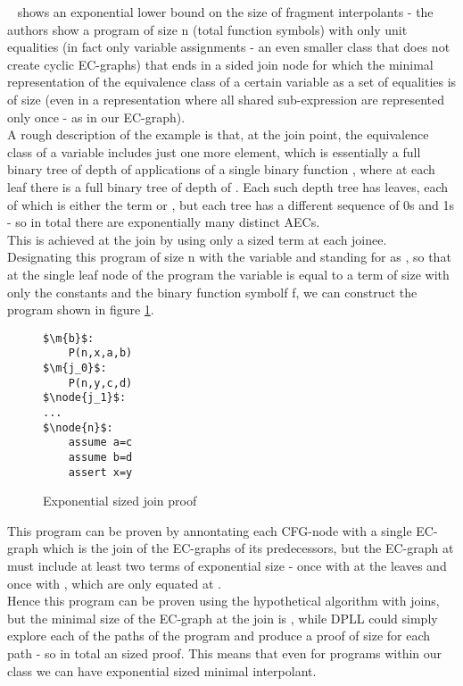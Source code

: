 ~\cite{GulwaniNecula07} shows an exponential lower bound on the size of fragment interpolants - the authors show a program of size n (total function symbols) with only unit equalities (in fact only variable assignments - an even smaller class that does not create cyclic EC-graphs) that ends in a  sided join node for which the minimal representation of the equivalence class of a certain variable as a set of equalities is of size  (even in a representation where all shared sub-expression are represented only once - as in our EC-graph).\\
A rough description of the example is that, at the join point, the equivalence class of a variable includes just one more element,
which is essentially a full binary tree of depth  of applications of a single binary function , 
where at each leaf there is a full binary tree of depth  of . Each such  depth tree has  leaves, each of which is either the term  or , but each tree has a different sequence of  0s and 1s - so in total there are exponentially many distinct AECs.\\
This is achieved at the join by using only a  sized term at each joinee.\\
Designating this program of size n with the variable  and  standing for  as , 
so that at the single leaf node of the program the variable  is equal to a term of size  with only the constants  and the binary function symbolf f, we can construct the program shown in figure \ref{snippet3.6}.
\begin{figure}
\begin{lstlisting}
$\m{b}$:
	P(n,x,a,b)
$\m{j_0}$:
	P(n,y,c,d)
$\node{j_1}$:
...
$\node{n}$:
	assume a=c
	assume b=d
	assert x=y
\end{lstlisting}
\caption{Exponential sized join proof}
\label{snippet3.6}
\end{figure}

This program can be proven by annontating each CFG-node with a single EC-graph which is the join of the EC-graphs of its predecessors, but the EC-graph at  must include at least two terms of exponential size - once with  at the leaves and once with , which are only equated at .\\
Hence this program can be proven using the hypothetical algorithm with joins, but the minimal size of the EC-graph at the join is , while DPLL could simply explore each of the  paths of the program and produce a proof of size  for each path - so in total an  sized proof.
This means that even for programs within our class we can have exponential sized minimal interpolant.

